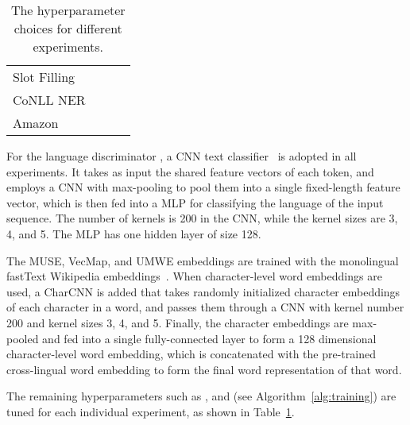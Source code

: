 \documentclass[11pt,a4paper]{article}
\begin{document}
\begin{table}
\centering
\begin{tabular}{l c c c}
        \toprule
        &  &  &  \\
        \midrule
        Slot Filling    &  &  &  \\
        CoNLL NER &  &  &  \\
        Amazon &  &  &  \\
        \bottomrule
    \end{tabular}
    \caption{The hyperparameter choices for different experiments.}
    \label{tab:hyperparam}
\end{table} 
For the language discriminator , a CNN text classifier~\cite{D14-1181} is adopted in all experiments.
It takes as input the shared feature vectors of each token, and employs a CNN with max-pooling to pool them into a single fixed-length feature vector, which is then fed into a MLP for classifying the language of the input sequence.
The number of kernels is 200 in the CNN, while the kernel sizes are 3, 4, and 5.
The MLP has one hidden layer of size 128.

The MUSE, VecMap, and UMWE embeddings are trained with the monolingual  fastText Wikipedia embeddings~\citep{bojanowski2016enriching}.
When character-level word embeddings are used, a CharCNN is added that takes randomly initialized character embeddings of each character in a word, and passes them through a CNN with kernel number 200 and kernel sizes 3, 4, and 5.
Finally, the character embeddings are max-pooled and fed into a single fully-connected layer to form a 128 dimensional character-level word embedding, which is concatenated with the pre-trained cross-lingual word embedding to form the final word representation of that word.

The remaining hyperparameters such as ,  and  (see Algorithm~\ref{alg:training}) are tuned for each individual experiment, as shown in Table~\ref{tab:hyperparam}. 
\end{document}
